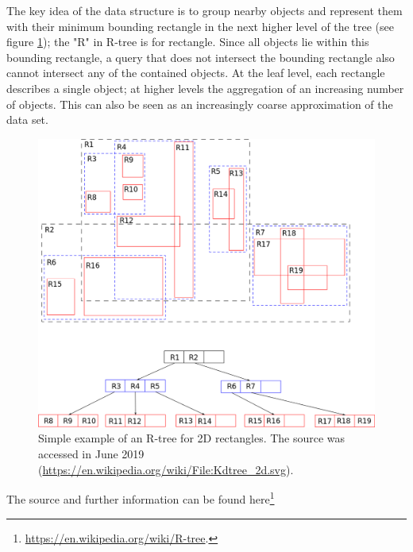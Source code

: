 \documentclass[12pt]{article}
\theoremstyle{plain}
\begin{document}
The key idea of the data structure is to group nearby objects and represent them with their minimum bounding rectangle in the next higher level of the tree (see figure \ref{rtree}); the "R" in R-tree is for rectangle. Since all objects lie within this bounding rectangle, a query that does not intersect the bounding rectangle also cannot intersect any of the contained objects. At the leaf level, each rectangle describes a single object; at higher levels the aggregation of an increasing number of objects. This can also be seen as an increasingly coarse approximation of the data set.

\begin{figure}[h!]
    \centering
	\includegraphics[width=.6\linewidth]{media/R-tree.png}
	\caption{Simple example of an R-tree for 2D rectangles. The source was accessed in June 2019 (\url{https://en.wikipedia.org/wiki/File:Kdtree_2d.svg}).}
	\label{rtree}
\end{figure}

%

The source and further information can be found here\footnote{\url{https://en.wikipedia.org/wiki/R-tree}.}


%

%

%

%



\end{document}
